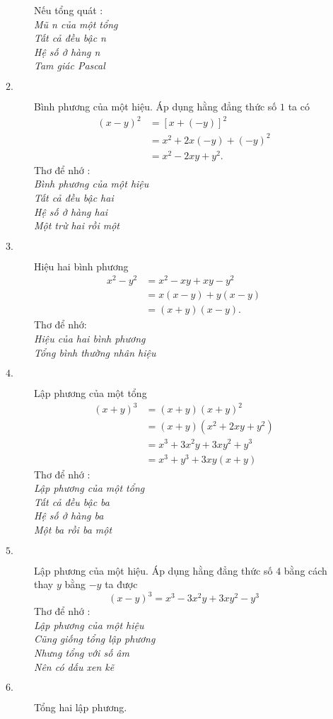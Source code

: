 \documentclass[14pt,twoside,a4paper, openany]{book}
\theoremstyle{definition}
\theoremstyle{plain}
\begin{document}
\begin{description}
\begin{description}
Nếu tổng quát :\\
\emph{Mũ n của một tổng\\
Tất cả đều bậc n\\
Hệ số ở hàng n\\
Tam giác Pascal}

\item[$2.$] Bình phương của một hiệu. Áp dụng hằng đẳng thức số $1$ ta có
\begin{equation*}
\begin{split}
(x-y)^2&=[x+(-y)]^2\\
   &=x^2+2x(-y)+(-y)^2\\
     &=x^2-2xy+y^2.
\end{split}
\end{equation*}
Thơ để nhớ :\\
\emph{Bình phương của một hiệu\\
Tất cả đều bậc hai\\
Hệ số ở hàng hai\\
Một trừ hai rồi một}
\item[$3.$] Hiệu hai bình phương
\begin{equation*}
\begin{split}
x^2-y^2&=x^2-xy+xy-y^2\\
                 &=x(x-y)+y(x-y)\\
                   &=(x+y)(x-y).
\end{split}
\end{equation*}
Thơ để nhớ:\\
\emph{Hiệu của hai bình phương\\
Tổng bình thường nhân hiệu\\}

\item[$4.$] Lập phương của một tổng
\begin{equation*}
\begin{split}
(x+y)^3&=(x+y)(x+y)^2\\
                 &=(x+y)(x^2+2xy+y^2)\\
                   &=x^3+3x^2y+3xy^2+y^3\\
                  &=x^3+y^3+3xy(x+y)
\end{split}
\end{equation*}
Thơ để nhớ :\\
\emph{Lập phương của một tổng\\
Tất cả đều bậc ba\\
Hệ số ở hàng ba\\
Một ba rồi ba một}
\item[$5.$] Lập phương của một hiệu. Áp dụng hằng đẳng thức số $4$ bằng cách thay $y$ bằng $-y$ ta được
$$ (x-y)^3=x^3-3x^2y+3xy^2-y^3 $$
Thơ để nhớ :\\
\emph{Lập phương của một hiệu\\
Cũng giống tổng lập phương\\
Nhưng tổng với số âm\\
Nên có dấu xen kẽ}
\item[$6.$] Tổng hai lập phương.


\end{description}
\end{description}
\end{document}
